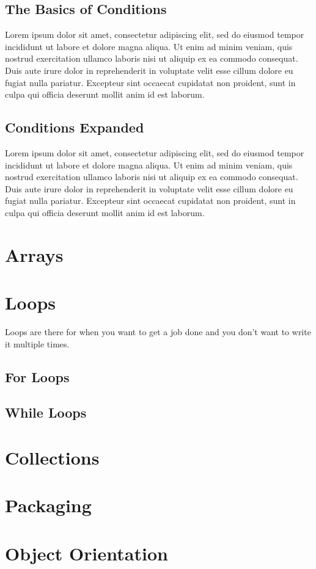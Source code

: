 \documentclass{article}
\begin{document}
\subsection{The Basics of Conditions}
Lorem ipsum dolor sit amet, consectetur adipiscing elit, sed do eiusmod tempor incididunt ut labore et dolore magna aliqua. Ut enim ad minim veniam, quis nostrud exercitation ullamco laboris nisi ut aliquip ex ea commodo consequat. Duis aute irure dolor in reprehenderit in voluptate velit esse cillum dolore eu fugiat nulla pariatur. Excepteur sint occaecat cupidatat non proident, sunt in culpa qui officia deserunt mollit anim id est laborum.


\subsection{Conditions Expanded}
Lorem ipsum dolor sit amet, consectetur adipiscing elit, sed do eiusmod tempor incididunt ut labore et dolore magna aliqua. Ut enim ad minim veniam, quis nostrud exercitation ullamco laboris nisi ut aliquip ex ea commodo consequat. Duis aute irure dolor in reprehenderit in voluptate velit esse cillum dolore eu fugiat nulla pariatur. Excepteur sint occaecat cupidatat non proident, sunt in culpa qui officia deserunt mollit anim id est laborum.


\section{Arrays}


\section{Loops}
Loops are there for when you want to get a job done and you don't want to write it multiple times.

\subsection{For Loops}


\subsection{While Loops}


\section{Collections}


\section{Packaging}


\section{Object Orientation}
\end{document}
